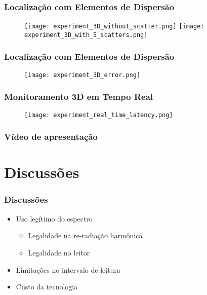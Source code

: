\begin{frame}
  \frametitle{Localização com Elementos de Dispersão}

  \begin{figure}
		  \centering
    \texttt{[image: experiment\_3D\_without\_scatter.png]}
				\vfill
    \texttt{[image: experiment\_3D\_with\_5\_scatters.png]}
		\end{figure}
\end{frame}

\begin{frame}
  \frametitle{Localização com Elementos de Dispersão}

  \begin{figure}
		  \vfill
  		\texttt{[image: experiment\_3D\_error.png]}
  \end{figure}
\end{frame}

\begin{frame}
  \frametitle{Monitoramento 3D em Tempo Real}

  \begin{figure}
		  \vfill
  		\texttt{[image: experiment\_real\_time\_latency.png]}
  \end{figure}
\end{frame}

\begin{frame}
  \frametitle{Vídeo de apresentação}
  \begin{center}
    \href{https://youtu.be/FwmQvAi7omo}{}
		\end{center}
\end{frame}

\section{Discussões}

\begin{frame}
  \frametitle{Discussões}

  \begin{itemize}
    \item Uso legítimo do espectro
				\begin{itemize}
				  \item Legalidade na re-radiação harmônica
						\item Legalidade no leitor
				\end{itemize}		
				\item Limitações no intervalo de leitura
				\item Custo da tecnologia
		\end{itemize}
\end{frame}

